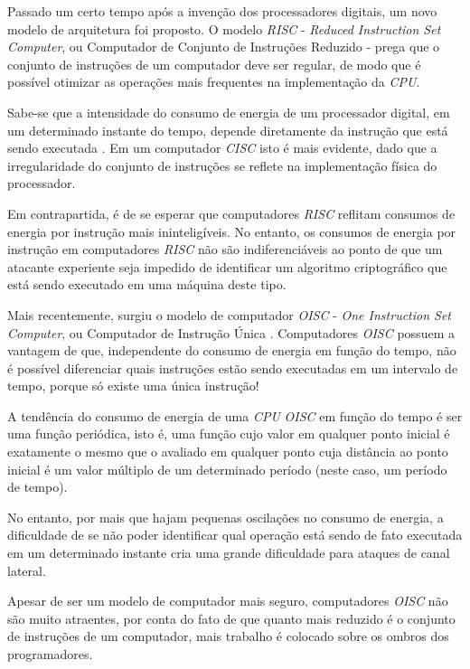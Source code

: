 Passado um certo tempo após a invenção dos processadores digitais, um novo
modelo de arquitetura foi proposto. O modelo \textit{RISC} - \textit{Reduced
  Instruction Set Computer}, ou Computador de Conjunto de Instruções Reduzido
\cite{patterson} - prega que o conjunto de instruções de um computador deve ser
regular, de modo que é possível otimizar as operações mais frequentes na
implementação da \textit{CPU}.

Sabe-se que a intensidade do consumo de energia de um processador digital, em um
determinado instante do tempo, depende diretamente da instrução que está sendo
executada \cite{hsieh2001microprocessor}. Em um computador \textit{CISC} isto é
mais evidente, dado que a irregularidade do conjunto de instruções se reflete na
implementação física do processador.

Em contrapartida, é de se esperar que computadores \textit{RISC} reflitam
consumos de energia por instrução mais ininteligíveis. No entanto, os consumos
de energia por instrução em computadores \textit{RISC} não são indiferenciáveis
ao ponto de que um atacante experiente seja impedido de identificar um algoritmo
criptográfico que está sendo executado em uma máquina deste tipo.

Mais recentemente, surgiu o modelo de computador \textit{OISC} - \textit{One
  Instruction Set Computer}, ou Computador de Instrução Única
\cite{ong2010implementation}. Computadores \textit{OISC} possuem a vantagem de
que, independente do consumo de energia em função do tempo, não é possível
diferenciar quais instruções estão sendo executadas em um intervalo de tempo,
porque só existe uma única instrução!

A tendência do consumo de energia de uma \textit{CPU} \textit{OISC} em função do
tempo é ser uma função periódica, isto é, uma função cujo valor em qualquer
ponto inicial é exatamente o mesmo que o avaliado em qualquer ponto cuja
distância ao ponto inicial é um valor múltiplo de um determinado período (neste
caso, um período de tempo).

No entanto, por mais que hajam pequenas oscilações no consumo de energia, a
dificuldade de se não poder identificar qual operação está sendo de fato
executada em um determinado instante cria uma grande dificuldade para ataques de
canal lateral.

Apesar de ser um modelo de computador mais seguro, computadores \textit{OISC}
não são muito atraentes, por conta do fato de que quanto mais reduzido é o
conjunto de instruções de um computador, mais trabalho é colocado sobre os
ombros dos programadores.

